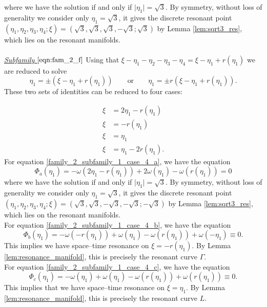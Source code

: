 \documentclass[reqno,english,11pt]{amsart}
\theoremstyle{definition}
\numberwithin{equation}{section}
\begin{document}
where we have the solution if and only if $\vert \eta_1\vert=\sqrt{3}$. By symmetry, without loss of generality we consider only $\eta_1=\sqrt{3}$, it gives the discrete resonant point $(\eta_1,\eta_2,\eta_3,\eta_4;\xi)=(\sqrt{3},\sqrt{3},\sqrt{3},-\sqrt{3};\sqrt{3})$ by Lemma \ref{lem:sqrt3_res}, which lies on the resonant manifolds.
\\\\
\noindent
{\it \underline{Subfamily $\eqref{eqn:fam_2_f}$}}
Using that $\xi-\eta_1-\eta_2-\eta_3-\eta_4=\xi-\eta_1+r(\eta_1)$ we are reduced to solve
$$\eta_1=\pm \left(\xi-\eta_1+r(\eta_1)\right)\qquad \text{or}\qquad \eta_1=\pm r(\xi-\eta_1+r(\eta_1)).$$
These two sets of identities can be reduced to four cases:

\begin{subequations}
    \begin{align}
         \xi&=2\eta_1-r(\eta_1) \tag{a} \label{family_2_subfamily_1_case_4_a}
  \\
  \xi&=-r(\eta_1) \tag{b} \label{family_2_subfamily_1_case_4_b}
 \\
  \xi&=\eta_1 \tag{c} \label{family_2_subfamily_1_case_4_c}
 \\
   \xi&= \eta_1-2r(\eta_1). \tag{d} \label{family_2_subfamily_1_case_4_d}
    \end{align} 
\end{subequations}
For equation \eqref{family_2_subfamily_1_case_4_a}, we have the equation
$$\Phi_a(\eta_1)=-\omega(2\eta_1-r(\eta_1))+2\omega(\eta_1)-\omega(r(\eta_1))=0$$
where we have the solution if and only if $\vert \eta_1\vert=\sqrt{3}$. By symmetry, without loss of generality we consider only $\eta_1=\sqrt{3}$, it gives the discrete resonant point $(\eta_1,\eta_2,\eta_3,\eta_4;\xi)=(\sqrt{3},\sqrt{3},-\sqrt{3},-\sqrt{3};-\sqrt{3})$  by Lemma \ref{lem:sqrt3_res}, which lies on the resonant manifolds.
\\
\noindent
For equation \eqref{family_2_subfamily_1_case_4_b}, we have the equation
$$\Phi_b(\eta_1)=-\omega(-r(\eta_1))+\omega(\eta_1)-\omega(r(\eta_1))+\omega(-\eta_1)\equiv0.$$
This implies we have space--time resonance on $\xi=-r(\eta_1)$. By Lemma \ref{lem:resonance_manifold}, this is precisely the resonant curve $\Gamma$.
\\
\noindent
For equation \eqref{family_2_subfamily_1_case_4_c}, we have the equation 
$$\Phi_c(\eta_1)=-\omega(\eta_1)+\omega(\eta_1)-\omega(r(\eta_1))+\omega(r(\eta_1))\equiv 0.$$
This implies that we have  space--time resonance on $\xi=\eta_1$. By Lemma \ref{lem:resonance_manifold}, this is precisely the resonant curve $L$.
\end{document}
